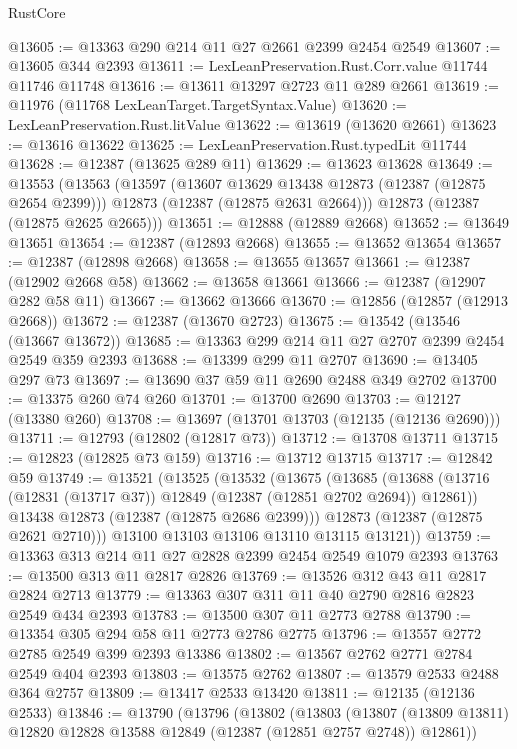\begin{lexlean}{RustCore}
\begin{coremodule}
@13605 := @13363 @290 @214 @11 @27 @2661 @2399 @2454 @2549
@13607 := @13605 @344 @2393
@13611 := LexLeanPreservation.Rust.Corr.value @11744 @11746 @11748
@13616 := @13611 @13297 @2723 @11 @289 @2661
@13619 := @11976 (@11768 LexLeanTarget.TargetSyntax.Value)
@13620 := LexLeanPreservation.Rust.litValue
@13622 := @13619 (@13620 @2661)
@13623 := @13616 @13622
@13625 := LexLeanPreservation.Rust.typedLit @11744
@13628 := @12387 (@13625 @289 @11)
@13629 := @13623 @13628
@13649 := @13553
    (@13563
      (@13597
        (@13607 @13629 @13438 @12873 (@12387 (@12875 @2654 @2399)))
        @12873
        (@12387 (@12875 @2631 @2664)))
      @12873
      (@12387 (@12875 @2625 @2665)))
@13651 := @12888 (@12889 @2668)
@13652 := @13649 @13651
@13654 := @12387 (@12893 @2668)
@13655 := @13652 @13654
@13657 := @12387 (@12898 @2668)
@13658 := @13655 @13657
@13661 := @12387 (@12902 @2668 @58)
@13662 := @13658 @13661
@13666 := @12387 (@12907 @282 @58 @11)
@13667 := @13662 @13666
@13670 := @12856 (@12857 (@12913 @2668))
@13672 := @12387 (@13670 @2723)
@13675 := @13542 (@13546 (@13667 @13672))
@13685 := @13363 @299 @214 @11 @27 @2707 @2399 @2454 @2549 @359 @2393
@13688 := @13399 @299 @11 @2707
@13690 := @13405 @297 @73
@13697 := @13690 @37 @59 @11 @2690 @2488 @349 @2702
@13700 := @13375 @260 @74 @260
@13701 := @13700 @2690
@13703 := @12127 (@13380 @260)
@13708 := @13697 (@13701 @13703 (@12135 (@12136 @2690)))
@13711 := @12793 (@12802 (@12817 @73))
@13712 := @13708 @13711
@13715 := @12823 (@12825 @73 @159)
@13716 := @13712 @13715
@13717 := @12842 @59
@13749 := @13521
    (@13525
      (@13532
        (@13675
          (@13685
            (@13688 (@13716 (@12831 (@13717 @37)) @12849 (@12387 (@12851 @2702 @2694)) @12861))
            @13438
            @12873
            (@12387 (@12875 @2686 @2399)))
          @12873
          (@12387 (@12875 @2621 @2710)))
        @13100
        @13103
        @13106
        @13110
        @13115
        @13121))
@13759 := @13363 @313 @214 @11 @27 @2828 @2399 @2454 @2549 @1079 @2393
@13763 := @13500 @313 @11 @2817 @2826
@13769 := @13526 @312 @43 @11 @2817 @2824 @2713
@13779 := @13363 @307 @311 @11 @40 @2790 @2816 @2823 @2549 @434 @2393
@13783 := @13500 @307 @11 @2773 @2788
@13790 := @13354 @305 @294 @58 @11 @2773 @2786 @2775
@13796 := @13557 @2772 @2785 @2549 @399 @2393 @13386
@13802 := @13567 @2762 @2771 @2784 @2549 @404 @2393
@13803 := @13575 @2762
@13807 := @13579 @2533 @2488 @364 @2757
@13809 := @13417 @2533 @13420
@13811 := @12135 (@12136 @2533)
@13846 := @13790
    (@13796
      (@13802
        (@13803
          (@13807 (@13809 @13811) @12820 @12828 @13588 @12849 (@12387 (@12851 @2757 @2748)) @12861))

\end{coremodule}
\end{lexlean}
